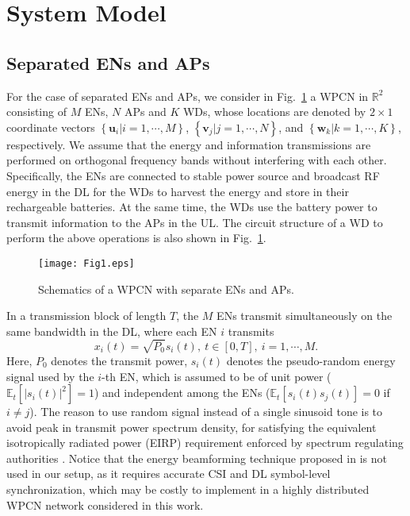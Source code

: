 \documentclass[journal, draftcls, one column, 12pt]{IEEEtran}
\begin{document}
\section{System Model}

\subsection{Separated ENs and APs}
For the case of separated ENs and APs, we consider in Fig.~\ref{61} a WPCN in $\mathbb{R}^2$ consisting of $M$ ENs, $N$ APs and $K$ WDs, whose locations are denoted by $2\times 1$ coordinate vectors $\left\{\mathbf{u}_i|i=1,\cdots,M\right\}$, $\left\{\mathbf{v}_j|j=1,\cdots,N\right\}$, and $\left\{\mathbf{w}_k |k=1,\cdots,K\right\}$, respectively. We assume that the energy and information transmissions are performed on orthogonal frequency bands without interfering with each other. Specifically, the ENs are connected to stable power source and broadcast RF energy in the DL for the WDs to harvest the energy and store in their rechargeable batteries. At the same time, the WDs use the battery power to transmit information to the APs in the UL. The circuit structure of a WD to perform the above operations is also shown in Fig.~\ref{61}.

\begin{figure}
\centering
  \begin{center}
    \texttt{[image: Fig1.eps]}
  \end{center}
  \caption{Schematics of a WPCN with separate ENs and APs.}
  \label{61}
\end{figure}

In a transmission block of length $T$, the $M$ ENs transmit simultaneously on the same bandwidth in the DL, where each EN $i$ transmits
\begin{equation}
x_i(t) = \sqrt{P_0} s_{i}(t), \ t\in \left[0, T\right],\ i=1,\cdots,M.
\end{equation}
Here, $P_0$ denotes the transmit power, $s_{i}(t)$ denotes the pseudo-random energy signal used by the $i$-th EN, which is assumed to be of unit power ($\mathbb{E}_t\left[|s_{i}(t)|^2\right]=1$) and independent among the ENs ($\mathbb{E}_t\left[s_{i}(t)s_{j}(t)\right] = 0$ if $i\neq j$). The reason to use random signal instead of a single sinusoid tone is to avoid peak in transmit power spectrum density, for satisfying the equivalent isotropically radiated power (EIRP) requirement enforced by spectrum regulating authorities \cite{2014:Bi}. Notice that the energy beamforming technique proposed in \cite{2013:Zhang} is not used in our setup, as it requires accurate CSI and DL symbol-level synchronization, which may be costly to implement in a highly distributed WPCN network considered in this work.
\end{document}
